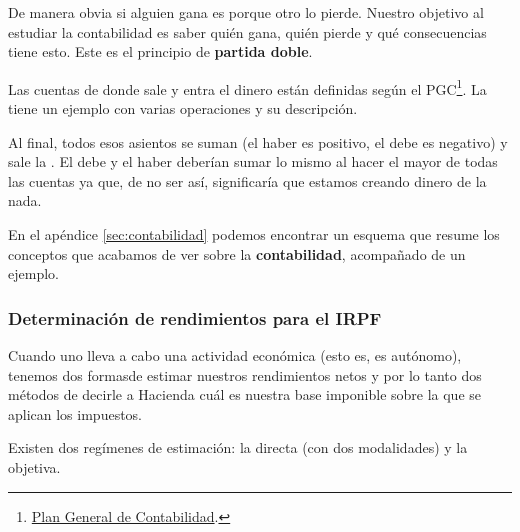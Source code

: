 \documentclass[nochap,palatino,shortheader]{apuntes}
\begin{document}
De manera obvia si alguien gana es porque otro lo pierde. Nuestro objetivo al estudiar la contabilidad es saber quién gana, quién pierde y qué consecuencias tiene esto. Este es el principio de \textbf{partida doble}.

Las cuentas de donde sale y entra el dinero están definidas según el PGC\footnote{\href{https://www.boe.es/boe/dias/2007/11/20/pdfs/C00001-00152.pdf}{Plan General de Contabilidad}.}. La  tiene un ejemplo con varias operaciones y su descripción.


Al final, todos esos asientos se suman (el haber es positivo, el debe es negativo) y sale la . El debe y el haber deberían sumar lo mismo al hacer el mayor de todas las cuentas ya que, de no ser así, significaría que estamos creando dinero de la nada.

En el apéndice \ref{sec:contabilidad} podemos encontrar un esquema que resume los conceptos que acabamos de ver sobre la \textbf{contabilidad}, acompañado de un ejemplo.

\subsubsection{Determinación de rendimientos para el IRPF}

Cuando uno lleva a cabo una actividad económica (esto es, es autónomo), tenemos dos formas\footnotemark de estimar nuestros rendimientos netos y por lo tanto dos métodos de decirle a Hacienda cuál es nuestra base imponible sobre la que se aplican los impuestos.


Existen dos regímenes de estimación: la directa (con dos modalidades) y la objetiva.
\end{document}

